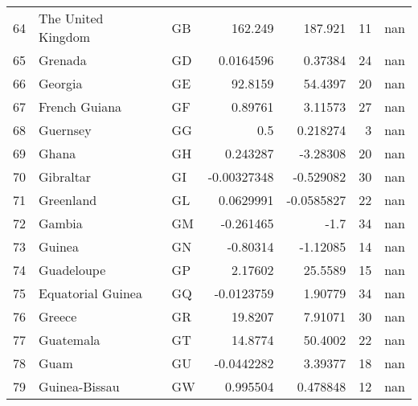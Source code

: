 \begin{tabular}{rllrrrr}
 64 & The United Kingdom               & GB         &  162.249      &   187.921     &     11 &          nan \\
 65 & Grenada                          & GD         &    0.0164596  &     0.37384   &     24 &          nan \\
 66 & Georgia                          & GE         &   92.8159     &    54.4397    &     20 &          nan \\
 67 & French Guiana                    & GF         &    0.89761    &     3.11573   &     27 &          nan \\
 68 & Guernsey                         & GG         &    0.5        &     0.218274  &      3 &          nan \\
 69 & Ghana                            & GH         &    0.243287   &    -3.28308   &     20 &          nan \\
 70 & Gibraltar                        & GI         &   -0.00327348 &    -0.529082  &     30 &          nan \\
 71 & Greenland                        & GL         &    0.0629991  &    -0.0585827 &     22 &          nan \\
 72 & Gambia                           & GM         &   -0.261465   &    -1.7       &     34 &          nan \\
 73 & Guinea                           & GN         &   -0.80314    &    -1.12085   &     14 &          nan \\
 74 & Guadeloupe                       & GP         &    2.17602    &    25.5589    &     15 &          nan \\
 75 & Equatorial Guinea                & GQ         &   -0.0123759  &     1.90779   &     34 &          nan \\
 76 & Greece                           & GR         &   19.8207     &     7.91071   &     30 &          nan \\
 77 & Guatemala                        & GT         &   14.8774     &    50.4002    &     22 &          nan \\
 78 & Guam                             & GU         &   -0.0442282  &     3.39377   &     18 &          nan \\
 79 & Guinea-Bissau                    & GW         &    0.995504   &     0.478848  &     12 &          nan \\
\hline
\end{tabular}